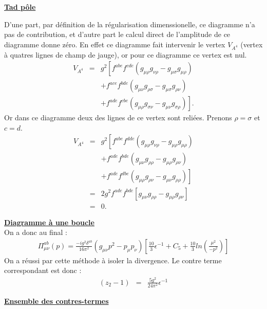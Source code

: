\documentclass[a4paper,11pt]{article} %
\theoremstyle{plain}
\theoremstyle{definition}
\theoremstyle{remark}
\numberwithin{equation}{section}
\numberwithin{equation}{subsection}
\numberwithin{figure}{section}
\begin{document}
\noindent
\underline{\textbf{Tad pôle}}


\noindent
D'une part, par définition de la régularisation dimenssionelle, ce diagramme n'a pas de contribution, 
et d'autre part le calcul direct de l'amplitude de ce diagramme donne zéro. En effet ce diagramme fait intervenir le vertex $V_{A^{4}}$ 
(vertex à quatres lignes de champ de jauge), or pour ce diagramme ce vertex est nul. 
\begin{eqnarray*}
 V_{A^{4}} &=& g^{2} \left[ f^{abe} f^{cde} \left( g_{\mu \rho}g_{\nu \rho} - g_{\mu \sigma}g_{\mu \rho} \right) \right. \nonumber  \\
&& + f^{ace} f^{bde} \left( g_{\mu \nu}g_{\rho \sigma} - g_{\mu \sigma}g_{\rho \nu} \right) \nonumber  \\
&& \left. +f^{ade} f^{cbe} \left( g_{\mu \rho}g_{\sigma \nu} - g_{\mu \nu}g_{\sigma \rho} \right) \right] .  
\end{eqnarray*}
Or dans ce diagramme deux des lignes de ce vertex sont reliées. Prenons $\rho=\sigma$ et $c=d$.
\begin{eqnarray*}
 V_{A^{4}} &=& g^{2} \left[ f^{abe} f^{dde} \left( g_{\mu \rho}g_{\nu \rho} - g_{\mu \rho}g_{\mu \rho} \right) \right. \nonumber  \\
&& + f^{ade} f^{bde} \left( g_{\mu \nu}g_{\rho \rho} - g_{\mu \rho}g_{\rho \nu} \right) \nonumber  \\
&& \left. +f^{ade} f^{dbe} \left( g_{\mu \rho}g_{\rho \nu} - g_{\mu \nu}g_{\rho \rho} \right) \right]  \\
           &=& 2 g^{2} f^{ade} f^{bde} \left[  g_{\mu \nu}g_{\rho \rho} - g_{\mu \rho}g_{\rho \nu} \right]  \\
           &=& 0 .
\end{eqnarray*}

\noindent
\noindent
\underline{\textbf{Diagramme à une boucle}} \\
On a donc au final :
\begin{eqnarray*}
\Pi^{ab}_{\mu \nu}(p) = \frac{-i g^2 \delta^{ab}}{16 \pi^{2}} 
\left( g_{\mu\nu}p^2 - p_{\mu}p_{\nu} \right) 
\left[ \frac{10}{3} \epsilon^{-1} + C_5 + \frac{10}{3} ln(\frac{\mu^2}{-p^2})  \right]
\end{eqnarray*}
On a réussi par cette méthode à isoler la divergence. Le contre terme correspondant est donc :
\begin{eqnarray*}
 (z_{2} - 1) &=& \frac{5g^2}{24 \pi^2} \epsilon^{-1}
\end{eqnarray*}

\vspace{2cm}
\noindent
\underline{\textbf{Ensemble des contres-termes}}\\
\end{document}
